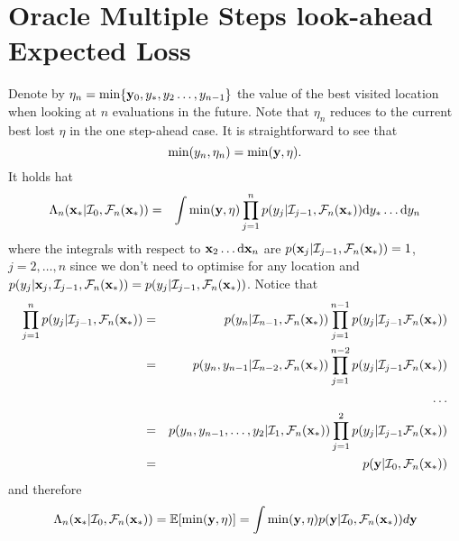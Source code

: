 \documentclass[twoside]{article}
\newcommand{\I}{\mathcal{I}}
\newcommand{\ud}{\mathrm{d}}
\newcommand{\E}{\mathbb{E}}
\newcommand{\future}{\mathcal{F}}
\begin{document}
\section{Oracle Multiple Steps look-ahead Expected Loss }
Denote by $\eta_n = \min \{\mathbf{y}_0, y_*, y_2\dots,y_{n-1}\}$ the value of the best visited location when looking at $n$ evaluations in the future. Note that $\eta_n$ reduces to the current best lost $\eta$ in the one step-ahead case. It is straightforward to see that 
$$ \min (y_n,\eta_n) = \min (\mathbf{y},\eta ).$$
It holds hat
\begin{eqnarray}\nonumber
\Lambda_n(\latentVector_*|\I_0, \future_{n}(\latentVector_*)) & = & \int \min (\dataVector,\eta) \prod_{j=1}^{n}p(y_{j}|\I_{j-1}, \future_{n}(\latentVector_*)) \ud y_*\dots \ud y_n
\end{eqnarray}
where the integrals with respect to $\latentVector_2\dots \ud\latentVector_n$ are  $p(\latentVector_{j}|\I_{j-1}, \future_{n}(\latentVector_*))=1$, $j=2,\dots,n$ since we don't need to optimise for any location and $p(y_{j}|\latentVector_{j},\I_{j-1}, \future_{n}(\latentVector_*))=p(y_{j}|\I_{j-1}, \future_{n}(\latentVector_*))$. Notice that
\begin{eqnarray}\nonumber
\prod_{j=1}^{n}p(y_{j}|\I_{j-1}, \future_{n}(\latentVector_*))& =& p(y_n|\I_{n-1}, \future_{n}(\latentVector_*)) \prod_{j=1}^{n-1}p(y_{j}|\I_{j-1} \future_{n}(\latentVector_*))\\\nonumber
& = & p(y_n,y_{n-1}|\I_{n-2}, \future_{n}(\latentVector_*))  \prod_{j=1}^{n-2}p(y_{j}|\I_{j-1} \future_{n}(\latentVector_*))\\\nonumber
& & \dots \\\nonumber
& = & p(y_n,y_{n-1},\dots,y_2|\I_{1}, \future_{n}(\latentVector_*))\prod_{j=1}^{2}p(y_{j}|\I_{j-1} \future_{n}(\latentVector_*))\\\nonumber
& = & p(\dataVector|\I_{0}, \future_{n}(\latentVector_*)) \nonumber
\end{eqnarray}
and therefore 
$$ \Lambda_n(\latentVector_*|\I_0, \future_{n}(\latentVector_*)) =\E [\min (\dataVector,\eta)] =\int \min (\dataVector,\eta)p(\dataVector|\I_{0}, \future_{n}(\latentVector_*))d\dataVector  $$

\vspace{1cm}
\end{document}
